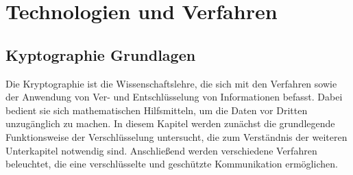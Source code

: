 \documentclass  [paper=a4,
				fontsize=12pt,
				listof=totoc,
				bibliography=totoc
				]{scrreprt}
\begin{document}
	\chapter{Technologien und Verfahren}
		\section{Kyptographie Grundlagen}
				Die Kryptographie ist die Wissenschaftslehre, die sich mit den Verfahren sowie der Anwendung von Ver- und Entschlüsselung von Informationen befasst. Dabei bedient sie sich mathematischen Hilfsmitteln, um die Daten vor Dritten unzugänglich zu machen. In diesem Kapitel werden zunächst die grundlegende Funktionsweise der Verschlüsselung untersucht, die zum Verständnis der weiteren Unterkapitel notwendig sind. Anschließend werden verschiedene Verfahren beleuchtet, die eine verschlüsselte und geschützte Kommunikation ermöglichen.
\end{document}
